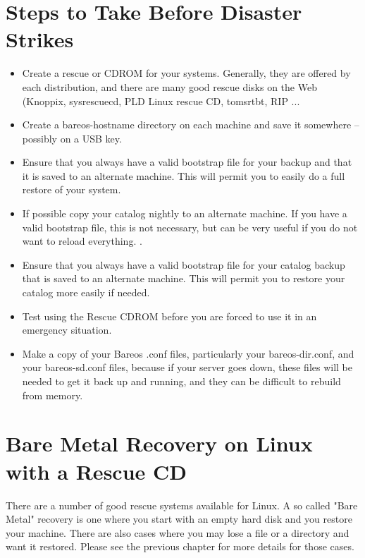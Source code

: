 \section{Steps to Take Before Disaster Strikes}
\label{steps1}


\begin{itemize}
\item Create a rescue or CDROM for your systems. Generally,
   they are offered by each distribution, and there are many good
   rescue disks on the Web (Knoppix, sysrescuecd, PLD Linux rescue CD,
   tomsrtbt, RIP ...
\item Create a bareos-hostname directory on
   each machine and save it somewhere -- possibly on a USB key.
\item Ensure that you always have a valid bootstrap file for your backup and
   that it is saved to an alternate machine.  This will permit you to
   easily do a full restore of your system.
\item If possible copy your catalog nightly to an alternate machine.  If you
   have a valid bootstrap file, this is not necessary, but  can be very useful if
   you do not want to reload everything. .
\item Ensure that you always have a valid bootstrap file for your  catalog
   backup that is saved to an alternate machine. This will  permit you to restore
   your catalog more easily if needed.
\item Test using the Rescue CDROM before you are forced to use it in
   an emergency situation.
\item Make a copy of your Bareos .conf files, particularly your
   bareos-dir.conf, and your bareos-sd.conf files, because if your server
   goes down, these files will be needed to get it back up and running,
   and they can be difficult to rebuild from memory.
\end{itemize}

\label{rescueCDROM}
\section{Bare Metal Recovery on Linux with a Rescue CD}

There are a number of good rescue systems available for Linux.
A so called "Bare Metal" recovery is one where you start with an empty hard
disk and you restore your machine. There are also cases where you may lose a
file or a directory and want it restored. Please see the previous chapter for
more details for those cases.

